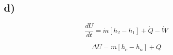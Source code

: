 

\subsection*{d)}

\[
\frac{dU}{dt} = \dot{m} \left[ h_2 - h_1 \right] + \dot{Q} - \dot{W}
\]

\[
\Delta U = m \left[ h_c - h_n \right] + Q
\]